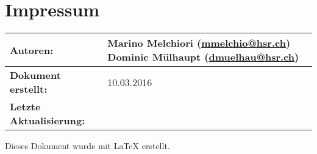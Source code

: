 \chapter*{Impressum}

\begin{table}[H] 
\centering 
\begin{tabular}{|p{0.35\twocelltabwidth}|p{0.65\twocelltabwidth}|}
\hline 
\textbf{Autoren:} & Marino Melchiori (\url{mmelchio@hsr.ch}) \newline
Dominic Mülhaupt (\url{dmuelhau@hsr.ch}) \\ 
\hline 
\textbf{Dokument erstellt:} & 10.03.2016 \\ 
\hline 
\textbf{Letzte Aktualisierung:} &  \\ 
\hline 
\end{tabular}
\end{table}

Dieses Dokument wurde mit \LaTeX{} erstellt.